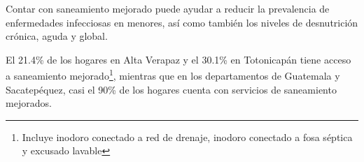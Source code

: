 Contar con saneamiento mejorado puede ayudar a reducir la prevalencia de  enfermedades infecciosas  en menores, así como también los niveles de desnutrición crónica, aguda y global. 

El 21.4\% de los hogares en Alta Verapaz y el 30.1\% en Totonicapán tiene acceso a saneamiento mejorado\footnote{Incluye inodoro conectado a red de drenaje, inodoro conectado a fosa séptica y excusado lavable}, mientras que en los departamentos de Guatemala y Sacatepéquez, casi el 90\% de los hogares cuenta con servicios de saneamiento mejorados.